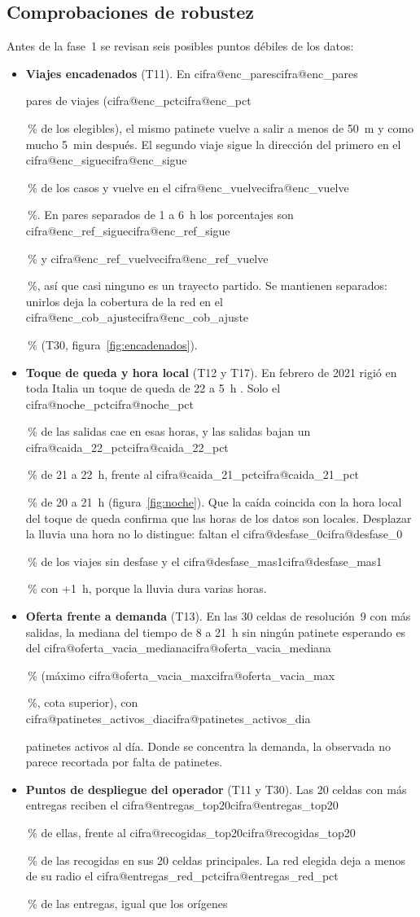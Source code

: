 \documentclass[11pt,a4paper]{article}
\makeatletter
\newcommand\cifra[1]{\ifcsname cifra@#1\endcsname\csname cifra@#1\endcsname
  \else\PackageError{memoria}{Cifra desconocida: \detokenize{#1}}{Revisa generar_cifras.py}\fi}
\newcommand\pc{\,\%}
\makeatother
\begin{document}
\subsection{Comprobaciones de robustez}\label{sec:robustez}
Antes de la fase~1 se revisan seis posibles puntos débiles de los datos:
\begin{itemize}
  \item \textbf{Viajes encadenados} (T11). En \cifra{enc_pares} pares de viajes
        (\cifra{enc_pct}\pc{} de los elegibles), el mismo patinete vuelve a salir a menos de
        50~m y como mucho 5~min después. El segundo viaje sigue la dirección del primero en el
        \cifra{enc_sigue}\pc{} de los casos y vuelve en el \cifra{enc_vuelve}\pc{}. En pares
        separados de 1 a 6~h los porcentajes son \cifra{enc_ref_sigue}\pc{} y
        \cifra{enc_ref_vuelve}\pc{}, así que casi ninguno es un trayecto partido. Se mantienen
        separados: unirlos deja la cobertura de la red en el \cifra{enc_cob_ajuste}\pc{} (T30,
        figura~\ref{fig:encadenados}).
  \item \textbf{Toque de queda y hora local} (T12 y T17). En febrero de 2021 rigió en toda
        Italia un toque de queda de 22 a 5~h \cite{dpcm2021}. Solo el \cifra{noche_pct}\pc{} de
        las salidas cae en esas horas, y las salidas bajan un \cifra{caida_22_pct}\pc{} de 21 a
        22~h, frente al \cifra{caida_21_pct}\pc{} de 20 a 21~h (figura~\ref{fig:noche}). Que la
        caída coincida con la hora local del toque de queda confirma que las horas de los datos
        son locales. Desplazar la lluvia una hora no lo distingue: faltan el
        \cifra{desfase_0}\pc{} de los viajes sin desfase y el \cifra{desfase_mas1}\pc{} con
        +1~h, porque la lluvia dura varias horas.
  \item \textbf{Oferta frente a demanda} (T13). En las 30 celdas de resolución~9 con más
        salidas, la mediana del tiempo de 8 a 21~h sin ningún patinete esperando es del
        \cifra{oferta_vacia_mediana}\pc{} (máximo \cifra{oferta_vacia_max}\pc{}, cota
        superior), con \cifra{patinetes_activos_dia} patinetes activos al día. Donde se concentra
        la demanda, la observada no parece recortada por falta de patinetes.
  \item \textbf{Puntos de despliegue del operador} (T11 y T30). Las 20 celdas con más entregas
        reciben el \cifra{entregas_top20}\pc{} de ellas, frente al \cifra{recogidas_top20}\pc{}
        de las recogidas en sus 20 celdas principales. La red elegida deja a menos de su radio
        el \cifra{entregas_red_pct}\pc{} de las entregas, igual que los orígenes

\end{itemize}
\end{document}
